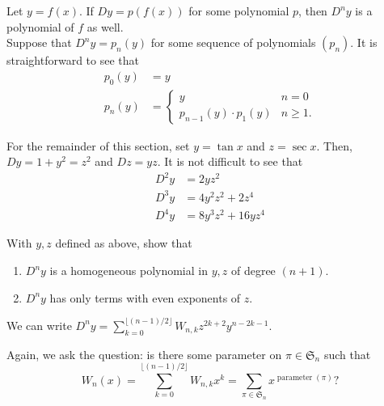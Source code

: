 	Let $y = f(x)$. If $Dy = p(f(x))$ for some polynomial $p$, then $D^ny$ is a polynomial of $f$ as well.\\
	Suppose that $D^ny = p_n(y)$ for some sequence of polynomials $(p_n)$.
	It is straightforward to see that
	\begin{align*}
		p_0(y) &= y \\
		p_n(y) &= \begin{cases} y & n=0 \\ p_{n-1}(y) \cdot p_1(y) & n \ge 1. \end{cases}
	\end{align*}


	For the remainder of this section, set $y = \tan x$ and $z = \sec x$. Then, $Dy = 1+y^2 = z^2$ and $Dz = yz$. It is not difficult to see that
	\begin{align*}
		D^2y &= 2yz^2 \\
		D^3y &= 4y^2z^2 + 2z^4 \\
		D^4y &= 8y^3z^2 + 16yz^4
	\end{align*}

	\begin{exercise}
		With $y,z$ defined as above, show that
		\begin{enumerate}
			\item $D^ny$ is a homogeneous polynomial in $y,z$ of degree $(n+1)$.
			\item $D^ny$ has only terms with even exponents of $z$.
		\end{enumerate}
	\end{exercise}

	\begin{fcor}
		We can write $D^ny = \sum_{k=0}^{\lfloor (n-1)/2 \rfloor} W_{n,k} z^{2k+2} y^{n-2k-1}$.
	\end{fcor}

	Again, we ask the question: is there some parameter on $\pi \in \mathfrak{S}_n$ such that
	\[ W_n(x) = \sum_{k = 0}^{\lfloor (n-1)/2 \rfloor} W_{n,k} x^k = \sum_{\pi \in \mathfrak{S}_n} x^{\operatorname{parameter}(\pi)}? \]

